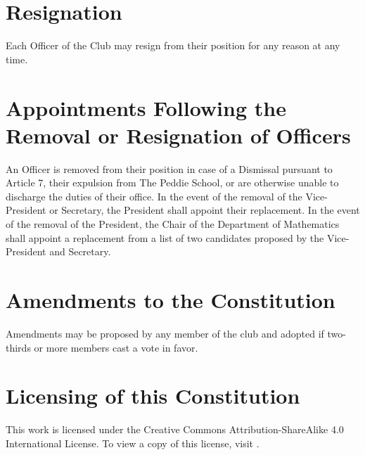\documentclass[12pt, letterpaper]{article}
\begin{document}
\section{Resignation}
Each Officer of the Club may resign from their position for any reason at any time.

\section{Appointments Following the Removal or Resignation of Officers}
An Officer is removed from their position in case of a Dismissal pursuant to Article 7, their expulsion from The Peddie School, or are otherwise unable to discharge the duties of their office. In the event of the removal of the Vice-President or Secretary, the President shall appoint their replacement. In the event of the removal of the President, the Chair of the Department of Mathematics shall appoint a replacement from a list of two candidates proposed by the Vice-President and Secretary.

\section{Amendments to the Constitution}
Amendments may be proposed by any member of the club and adopted if  two-thirds or more members cast a vote in favor.

\section{Licensing of this Constitution}
This work is licensed under the Creative Commons Attribution-ShareAlike 4.0 International License. To view a copy of this license, visit \underline{\href{https://creativecommons.org/licenses/by-sa/4.0/}{\color{blue}{https://creativecommons.org/licenses/by-sa/4.0/}}}.
\end{document}
